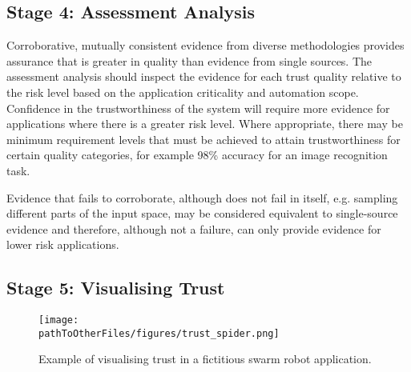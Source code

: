 \subsection{Stage 4: Assessment Analysis}


Corroborative, mutually consistent evidence from diverse methodologies provides assurance that is greater in quality than evidence from single sources. 
%
The assessment analysis should inspect the evidence for each trust quality relative to the risk level based on the application criticality and automation scope. Confidence in the trustworthiness of the system will require more evidence for applications where there is a greater risk level. 
%
Where appropriate, there may be minimum requirement levels that must be achieved to attain trustworthiness for certain quality categories, for example 98\% accuracy for an image recognition task.

Evidence that fails to corroborate, although does not fail in itself, e.g. sampling different parts of the input space, may be considered equivalent to single-source evidence and therefore, although not a failure, can only provide evidence for lower risk applications.


\subsection{Stage 5: Visualising Trust}

\begin{figure}[]
    \centering
    \texttt{[image: \\pathToOtherFiles/figures/trust\_spider.png]}
    \caption{Example of visualising trust in a fictitious swarm robot application.}
    \label{fig:spider}
\end{figure}

